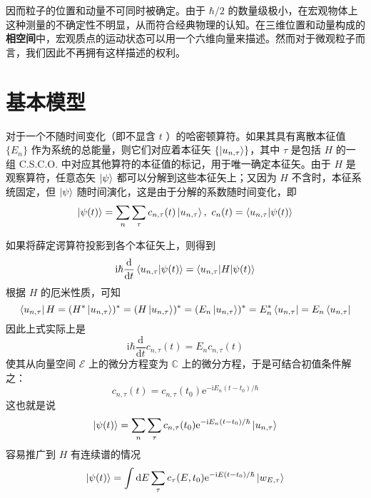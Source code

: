 \documentclass[cn,10pt,math=newtx,citestyle=gb7714-2015,bibstyle=gb7714-2015]{elegantbook}
\def\ms{\mathscr}
\def\d{\mathrm d}
\def\e{\mathrm e}
\def\i{\mathrm i}
\def\C{\mathbb C}
\begin{document}
因而粒子的位置和动量不可同时被确定。由于 $\hbar/2$ 的数量级极小，在宏观物体上这种测量的不确定性不明显，从而符合经典物理的认知。在三维位置和动量构成的\textbf{相空间}中，宏观质点的运动状态可以用一个六维向量来描述。然而对于微观粒子而言，我们因此不再拥有这样描述的权利。

\section{基本模型}

对于一个不随时间变化（即不显含 $t$ ）的哈密顿算符。如果其具有离散本征值 $\{E_n\}$ 作为系统的总能量，则它们对应着本征矢 $\{\ket{u_{n,\tau}}\}$，其中 $\tau$ 是包括 $H$ 的一组 C.S.C.O. 中对应其他算符的本征值的标记，用于唯一确定本征矢。由于 $H$ 是观察算符，任意态矢 $\ket{\psi}$ 都可以分解到这些本征矢上；又因为 $H$ 不含时，本征系统固定，但 $\ket{\psi}$ 随时间演化，这是由于分解的系数随时间变化，即
\begin{equation}
   \ket{\psi(t)}=\sum_n\sum_\tau c_{n,\tau}(t)\ket{u_{n,\tau}},\ c_n(t)=\braket{u_{n,\tau}|\psi(t)}
\end{equation}

如果将薛定谔算符投影到各个本征矢上，则得到
\begin{equation}
   \i\hbar\frac{\d}{\d t}\braket{u_{n,\tau}|\psi(t)}=\braket{u_{n,\tau}|H|\psi(t)}
\end{equation}
根据 $H$ 的厄米性质，可知
\begin{equation}
   \bra{u_{n,\tau}}H=(H^*\ket{u_{n,\tau}})^*=(H\ket{u_{n,\tau}})^*=(E_n\ket{u_{n,\tau}})^*=E_n^*\bra{u_{n,\tau}}=E_n\bra{u_{n,\tau}}
\end{equation}
因此上式实际上是
\begin{equation}
   \i\hbar\frac{\d}{\d t}c_{n,\tau}(t)=E_nc_{n,\tau}(t)
\end{equation}
使其从向量空间 $\ms E$ 上的微分方程变为 $\C$ 上的微分方程，于是可结合初值条件解之：
\begin{equation}
   c_{n,\tau}(t)=c_{n,\tau}(t_0)\e^{-\i E_n(t-t_0)/\hbar}
\end{equation}
这也就是说
\begin{equation}
   \ket{\psi(t)}=\sum_n\sum_{\tau}c_{n,\tau}(t_0)\e^{-\i E_n(t-t_0)/\hbar}\ket{u_{n,\tau}}
\end{equation}
容易推广到 $H$ 有连续谱的情况
\begin{equation}
   \ket{\psi(t)}=\int\d E\sum_{\tau}c_{\tau}(E,t_0)\e^{-\i E(t-t_0)/\hbar}\ket{w_{E,\tau}}
\end{equation}
\end{document}
